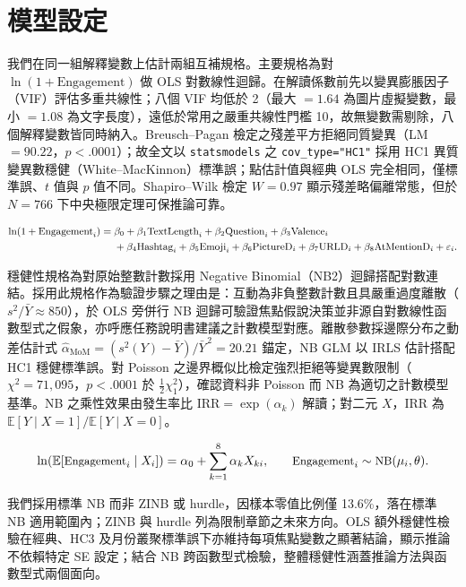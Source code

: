\documentclass[12pt,a4paper]{ctexart}
\begin{document}
\section{模型設定}

我們在同一組解釋變數上估計兩組互補規格。主要規格為對 $\ln(1+\text{Engagement})$ 做 OLS 對數線性迴歸。在解讀係數前先以變異膨脹因子（VIF）評估多重共線性；八個 VIF 均低於 2（最大 $=1.64$ 為圖片虛擬變數，最小 $=1.08$ 為文字長度），遠低於常用之嚴重共線性門檻 10，故無變數需剔除，八個解釋變數皆同時納入。Breusch--Pagan 檢定之殘差平方拒絕同質變異（LM $=90.22$，$p<.0001$）；故全文以 \texttt{statsmodels} 之 \texttt{cov\_type="HC1"} 採用 HC1 異質變異數穩健（White--MacKinnon）標準誤；點估計值與經典 OLS 完全相同，僅標準誤、$t$ 值與 $p$ 值不同。Shapiro--Wilk 檢定 $W=0.97$ 顯示殘差略偏離常態，但於 $N=766$ 下中央極限定理可保推論可靠。

\begin{equation}\small
\begin{aligned}
\ln(1+\text{Engagement}_i) ={}& \beta_0 + \beta_1\text{TextLength}_i + \beta_2\text{Question}_i + \beta_3\text{Valence}_i \\
& + \beta_4\text{Hashtag}_i + \beta_5\text{Emoji}_i + \beta_6\text{PictureD}_i + \beta_7\text{URLD}_i + \beta_8\text{AtMentionD}_i + \varepsilon_i.
\end{aligned}
\end{equation}

穩健性規格為對原始整數計數採用 Negative Binomial（NB2）迴歸搭配對數連結。採用此規格作為驗證步驟之理由是：互動為非負整數計數且具嚴重過度離散（$s^2/\bar Y \approx 850$），於 OLS 旁併行 NB 迴歸可驗證焦點假說決策並非源自對數線性函數型式之假象，亦呼應任務說明書建議之計數模型對應。離散參數採邊際分布之動差估計式 $\hat\alpha_{\text{MoM}}=(s^2(Y)-\bar Y)/\bar Y^{\,2}=20.21$ 錨定，NB GLM 以 IRLS 估計搭配 HC1 穩健標準誤。對 Poisson 之邊界概似比檢定強烈拒絕等變異數限制（$\chi^2=71{,}095$，$p<.0001$ 於 $\tfrac12 \chi^2_1$），確認資料非 Poisson 而 NB 為適切之計數模型基準。NB 之乘性效果由發生率比 $\text{IRR}=\exp(\alpha_k)$ 解讀；對二元 $X$，IRR 為 $\mathbb{E}[Y\mid X=1]/\mathbb{E}[Y\mid X=0]$。

\begin{equation}\small
\ln(\mathbb{E}[\text{Engagement}_i \mid X_i]) = \alpha_0 + \sum_{k=1}^{8}\alpha_k X_{ki},\qquad \text{Engagement}_i \sim \text{NB}(\mu_i, \theta).
\end{equation}

我們採用標準 NB 而非 ZINB 或 hurdle，因樣本零值比例僅 13.6\%，落在標準 NB 適用範圍內；ZINB 與 hurdle 列為限制章節之未來方向。OLS 額外穩健性檢驗在經典、HC3 及月份叢聚標準誤下亦維持每項焦點變數之顯著結論，顯示推論不依賴特定 SE 設定；結合 NB 跨函數型式檢驗，整體穩健性涵蓋推論方法與函數型式兩個面向。
\end{document}
